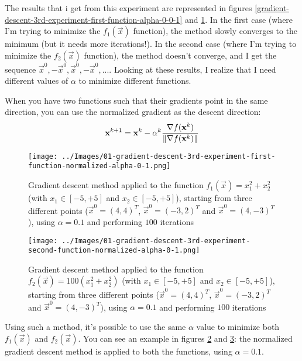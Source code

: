 \begin{enumerate}
\begin{figure}
                \label{gradient-descent-3rd-experiment-second-function-alpha-0-0-1}
            \end{figure}
            The results that i get from this experiment are represented in figures \ref{gradient-descent-3rd-experiment-first-function-alpha-0-0-1} and \ref{gradient-descent-3rd-experiment-second-function-alpha-0-0-1}. In the first case (where I'm trying to minimize the \(f_1(\vec{x})\) function), the method slowly converges to the minimum (but it needs more iterations!). In the second case (where I'm trying to minimize the \(f_2(\vec{x})\) function), the method doesn't converge, and I get the sequence \(\vec{x}^0, -\vec{x}^0, \vec{x}^0, -\vec{x}^0, ...\). Looking at these results, I realize that I need different values of \(\alpha\) to minimize different functions.\par
            When you have two functions such that their gradients point in the same direction, you can use the normalized gradient as the descent direction:
            \[\mathbf{x}^{k+1} = \mathbf{x}^k - \alpha^k \frac{\nabla f(\mathbf{x}^k)}{\left\lVert\nabla f(\mathbf{x}^k)\right\rVert}\]
            \begin{figure}
                \centering
                \texttt{[image: ../Images/01-gradient-descent-3rd-experiment-first-function-normalized-alpha-0-1.png]}
                \caption{Gradient descent method applied to the function \(f_1(\vec{x}) = x_{1}^{2} + x_{2}^{2}\) (with \(x_1 \in [-5, +5]\) and \(x_2 \in [-5, +5]\)), starting from three different points (\(\vec{x}^0 = (4,4)^T\), \(\vec{x}^0 = (-3,2)^T\) and \(\vec{x}^0 = (4,-3)^T\)), using \(\alpha = 0.1\) and performing \(100\) iterations}
                \label{gradient-descent-3rd-experiment-first-function-normalized-alpha-0-1}
            \end{figure}
            \begin{figure}
                \centering
                \texttt{[image: ../Images/01-gradient-descent-3rd-experiment-second-function-normalized-alpha-0-1.png]}
                \caption{Gradient descent method applied to the function \(f_2(\vec{x}) = 100(x_{1}^{2} + x_{2}^{2})\) (with \(x_1 \in [-5, +5]\) and \(x_2 \in [-5, +5]\)), starting from three different points (\(\vec{x}^0 = (4,4)^T\), \(\vec{x}^0 = (-3,2)^T\) and \(\vec{x}^0 = (4,-3)^T\)), using \(\alpha = 0.1\) and performing \(100\) iterations}
                \label{gradient-descent-3rd-experiment-second-function-normalized-alpha-0-1}
            \end{figure}
            Using such a method, it's possible to use the same \(\alpha\) value to minimize both \(f_1(\vec{x})\) and \(f_2(\vec{x})\). You can see an example in figures \ref{gradient-descent-3rd-experiment-first-function-normalized-alpha-0-1} and \ref{gradient-descent-3rd-experiment-second-function-normalized-alpha-0-1}: the normalized gradient descent method is applied to both the functions, using \(\alpha = 0.1\).
        \end{enumerate}